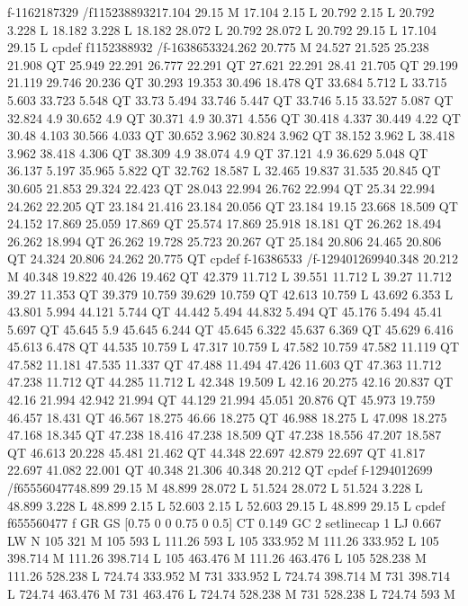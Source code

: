 f-1162187329
/f1152388932{17.104 29.15 M
17.104 2.15 L
20.792 2.15 L
20.792 3.228 L
18.182 3.228 L
18.182 28.072 L
20.792 28.072 L
20.792 29.15 L
17.104 29.15 L
cp}def
f1152388932
/f-16386533{24.262 20.775 M
24.527 21.525 25.238 21.908 QT
25.949 22.291 26.777 22.291 QT
27.621 22.291 28.41 21.705 QT
29.199 21.119 29.746 20.236 QT
30.293 19.353 30.496 18.478 QT
33.684 5.712 L
33.715 5.603 33.723 5.548 QT
33.73 5.494 33.746 5.447 QT
33.746 5.15 33.527 5.087 QT
32.824 4.9 30.652 4.9 QT
30.371 4.9 30.371 4.556 QT
30.418 4.337 30.449 4.22 QT
30.48 4.103 30.566 4.033 QT
30.652 3.962 30.824 3.962 QT
38.152 3.962 L
38.418 3.962 38.418 4.306 QT
38.309 4.9 38.074 4.9 QT
37.121 4.9 36.629 5.048 QT
36.137 5.197 35.965 5.822 QT
32.762 18.587 L
32.465 19.837 31.535 20.845 QT
30.605 21.853 29.324 22.423 QT
28.043 22.994 26.762 22.994 QT
25.34 22.994 24.262 22.205 QT
23.184 21.416 23.184 20.056 QT
23.184 19.15 23.668 18.509 QT
24.152 17.869 25.059 17.869 QT
25.574 17.869 25.918 18.181 QT
26.262 18.494 26.262 18.994 QT
26.262 19.728 25.723 20.267 QT
25.184 20.806 24.465 20.806 QT
24.324 20.806 24.262 20.775 QT
cp}def
f-16386533
/f-1294012699{40.348 20.212 M
40.348 19.822 40.426 19.462 QT
42.379 11.712 L
39.551 11.712 L
39.27 11.712 39.27 11.353 QT
39.379 10.759 39.629 10.759 QT
42.613 10.759 L
43.692 6.353 L
43.801 5.994 44.121 5.744 QT
44.442 5.494 44.832 5.494 QT
45.176 5.494 45.41 5.697 QT
45.645 5.9 45.645 6.244 QT
45.645 6.322 45.637 6.369 QT
45.629 6.416 45.613 6.478 QT
44.535 10.759 L
47.317 10.759 L
47.582 10.759 47.582 11.119 QT
47.582 11.181 47.535 11.337 QT
47.488 11.494 47.426 11.603 QT
47.363 11.712 47.238 11.712 QT
44.285 11.712 L
42.348 19.509 L
42.16 20.275 42.16 20.837 QT
42.16 21.994 42.942 21.994 QT
44.129 21.994 45.051 20.876 QT
45.973 19.759 46.457 18.431 QT
46.567 18.275 46.66 18.275 QT
46.988 18.275 L
47.098 18.275 47.168 18.345 QT
47.238 18.416 47.238 18.509 QT
47.238 18.556 47.207 18.587 QT
46.613 20.228 45.481 21.462 QT
44.348 22.697 42.879 22.697 QT
41.817 22.697 41.082 22.001 QT
40.348 21.306 40.348 20.212 QT
cp}def
f-1294012699
/f655560477{48.899 29.15 M
48.899 28.072 L
51.524 28.072 L
51.524 3.228 L
48.899 3.228 L
48.899 2.15 L
52.603 2.15 L
52.603 29.15 L
48.899 29.15 L
cp}def
f655560477
f
GR
GS
[0.75 0 0 0.75 0 0.5] CT
0.149 GC
2 setlinecap
1 LJ
0.667 LW
N
105 321 M
105 593 L
111.26 593 L
105 333.952 M
111.26 333.952 L
105 398.714 M
111.26 398.714 L
105 463.476 M
111.26 463.476 L
105 528.238 M
111.26 528.238 L
724.74 333.952 M
731 333.952 L
724.74 398.714 M
731 398.714 L
724.74 463.476 M
731 463.476 L
724.74 528.238 M
731 528.238 L
724.74 593 M
